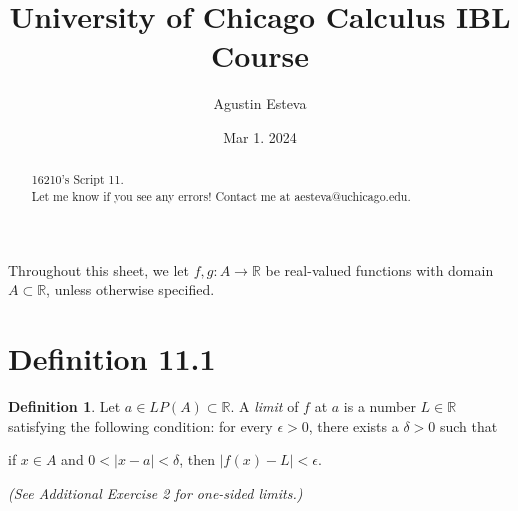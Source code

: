 \documentclass[openany, amssymb, psamsfonts]{amsart}
\title{University of Chicago Calculus IBL Course}
\author{Agustin Esteva}
\date{Mar 1. 2024}
\newcommand{\bbR}{\mathbb{R}}
\newcommand{\abs}[1]{\lvert #1 \rvert}
\theoremstyle{definition}
\newtheorem{defn}{Definition}[section]
\numberwithin{equation}{section}
\begin{document}
\begin{abstract}

16210's Script 11.\\ Let me know if you see any errors! Contact me at aesteva@uchicago.edu.


\end{abstract}

\maketitle

\tableofcontents

\setcounter{section}{11}
Throughout this sheet, we let $f, g\colon A \to \bbR$
be real-valued functions with domain $A \subset \bbR$, unless otherwise specified.
\section*{Definition 11.1}

\begin{defn}
\label{11.1}
	Let $a \in LP(A) \subset \bbR$. A \emph{limit} of $f$ at $a$ is a number $L \in \bbR$ satisfying the following condition: for every $\epsilon > 0$, there exists a $\delta > 0$ such that
	\begin{center}
		if $x \in A$ and $0 < \abs{x - a} < \delta$, \quad then $\abs{f(x) - L} < \epsilon$.
	\end{center}
{\em (See Additional Exercise 2 for one-sided limits.)}
\end{defn}
\end{document}

